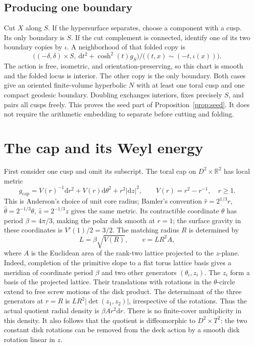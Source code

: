 \documentclass[11pt]{article}
\theoremstyle{remark}
\newcommand{\RR}{\mathbb R}
\newcommand{\dd}{\mathrm d}
\begin{document}
\subsection{Producing one boundary}

Cut \(X\) along \(S\). If the hypersurface separates, choose a component with a cusp. Its only boundary is \(S\). If the cut complement is connected, identify one of its two boundary copies by \(\iota\). A neighborhood of that folded copy is
\[
\big((-\delta,\delta)\times S,\ \dd t^2+\cosh^2(t)g_S\big)
  /\big((t,x)\sim(-t,\iota(x))\big).
\]
The action is free, isometric, and orientation-preserving, so this chart is smooth and the folded locus is interior. The other copy is the only boundary. Both cases give an oriented finite-volume hyperbolic \(N\) with at least one toral cusp and one compact geodesic boundary. Doubling exchanges interiors, fixes precisely \(S\), and pairs all cusps freely. This proves the seed part of Proposition~\ref{prop:seed}. It does not require the arithmetic embedding to separate before cutting and folding.

\section{The cap and its Weyl energy}\label{sec:cap}

First consider one cusp and omit its subscript. The toral cap on \(D^2\times\RR^2\) has local metric
\begin{equation}\label{eq:cap}
  g_{\mathrm{cap}}
    =V(r)^{-1}\dd r^2+V(r)\dd\theta^2+r^2|\dd z|^2,
   \qquad V(r)=r^2-r^{-1},\quad r\ge1.
\end{equation}
This is Anderson's choice of unit core radius; Bamler's convention \(\widehat r=2^{1/3}r\), \(\widehat\theta=2^{-1/3}\theta\), \(\widehat z=2^{-1/3}z\) gives the same metric. Its contractible coordinate \(\theta\) has period \(\beta=4\pi/3\), making the polar disk smooth at \(r=1\); the surface gravity in these coordinates is \(V'(1)/2=3/2\). The matching radius \(R\) is determined by
\begin{equation}\label{eq:match}
 L=\beta\sqrt{V(R)},\qquad v=L R^2 A,
\end{equation}
where \(A\) is the Euclidean area of the rank-two lattice projected to the \(z\)-plane. Indeed, completion of the primitive slope to a flat torus lattice basis gives a meridian of coordinate period \(\beta\) and two other generators \((\theta_i,z_i)\). The \(z_i\) form a basis of the projected lattice. Their translations with rotations in the \(\theta\)-circle extend to free screw motions of the disk product. The determinant of the three generators at \(r=R\) is \(L R^2|\det(z_1,z_2)|\), irrespective of the rotations. Thus the actual quotient radial density is \(\beta A r^2\dd r\). There is no finite-cover multiplicity in this density. It also follows that the quotient is diffeomorphic to \(D^2\times T^2\): the two constant disk rotations can be removed from the deck action by a smooth disk rotation linear in \(z\).
\end{document}
